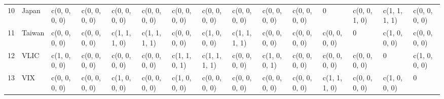 \begin{table}[ht]
\begin{tabular}{lllllllllllllll}
  10 & Japan & c(0, 0, 0, 0) & c(0, 0, 0, 0) & c(0, 0, 0, 0) & c(0, 0, 0, 0) & c(0, 0, 0, 0) & c(0, 0, 0, 0) & c(0, 0, 0, 0) & c(0, 0, 0, 0) & c(0, 0, 0, 0) &             0 & c(0, 0, 1, 0) & c(1, 1, 1, 1) & c(0, 0, 0, 0) \\ 
  11 & Taiwan & c(0, 0, 0, 0) & c(0, 0, 0, 0) & c(1, 1, 1, 0) & c(1, 1, 1, 1) & c(0, 0, 0, 0) & c(1, 0, 0, 0) & c(1, 1, 1, 1) & c(0, 0, 0, 0) & c(0, 0, 0, 0) & c(0, 0, 0, 0) &             0 & c(1, 0, 0, 0) & c(0, 0, 0, 0) \\ 
  12 & VLIC & c(1, 0, 0, 0) & c(0, 0, 0, 0) & c(0, 0, 0, 0) & c(0, 0, 0, 0) & c(1, 1, 0, 1) & c(1, 1, 1, 1) & c(0, 0, 0, 0) & c(1, 0, 0, 1) & c(0, 0, 0, 0) & c(0, 0, 0, 0) & c(0, 0, 0, 0) &             0 & c(1, 0, 0, 0) \\ 
  13 & VIX & c(0, 0, 0, 0) & c(0, 0, 0, 0) & c(1, 0, 0, 0) & c(0, 0, 0, 0) & c(1, 0, 0, 0) & c(0, 0, 0, 0) & c(0, 0, 0, 0) & c(0, 0, 0, 0) & c(0, 0, 0, 0) & c(1, 1, 1, 0) & c(0, 0, 0, 0) & c(1, 0, 0, 0) &             0 \\ 
   \hline
\end{tabular}
\end{table}
